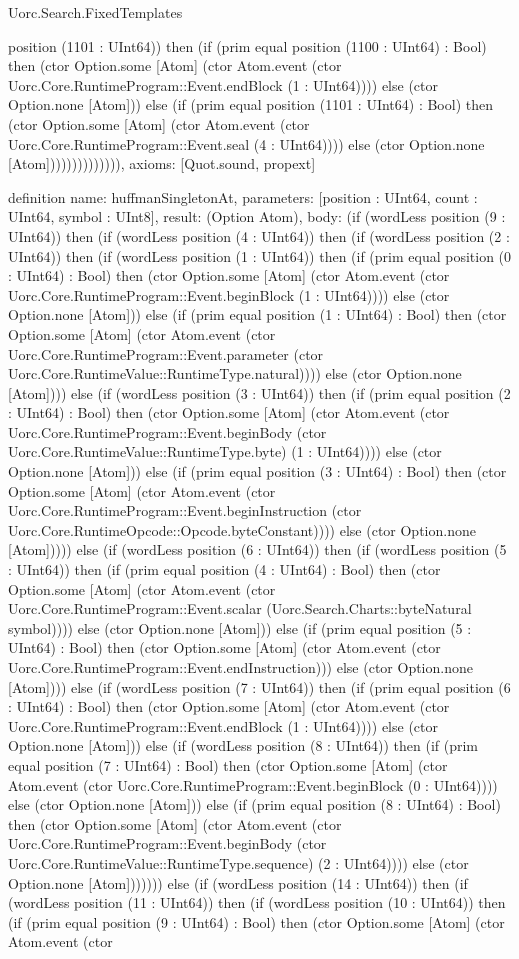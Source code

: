 \begin{lexlean}{Uorc.Search.FixedTemplates}
\begin{semanticmodule}
{position (1101 : UInt64)) then (if (prim equal position (1100 : UInt64) : Bool) then (ctor Option.some [Atom] (ctor Atom.event (ctor Uorc.Core.RuntimeProgram::Event.endBlock (1 : UInt64)))) else (ctor Option.none [Atom])) else (if (prim equal position (1101 : UInt64) : Bool) then (ctor Option.some [Atom] (ctor Atom.event (ctor Uorc.Core.RuntimeProgram::Event.seal (4 : UInt64)))) else (ctor Option.none [Atom]))))))))))))),
  axioms: [Quot.sound, propext]
}

definition{
  name: huffmanSingletonAt,
  parameters: [position : UInt64, count : UInt64, symbol : UInt8],
  result: (Option Atom),
  body: (if (wordLess position (9 : UInt64)) then (if (wordLess position (4 : UInt64)) then (if (wordLess position (2 : UInt64)) then (if (wordLess position (1 : UInt64)) then (if (prim equal position (0 : UInt64) : Bool) then (ctor Option.some [Atom] (ctor Atom.event (ctor Uorc.Core.RuntimeProgram::Event.beginBlock (1 : UInt64)))) else (ctor Option.none [Atom])) else (if (prim equal position (1 : UInt64) : Bool) then (ctor Option.some [Atom] (ctor Atom.event (ctor Uorc.Core.RuntimeProgram::Event.parameter (ctor Uorc.Core.RuntimeValue::RuntimeType.natural)))) else (ctor Option.none [Atom]))) else (if (wordLess position (3 : UInt64)) then (if (prim equal position (2 : UInt64) : Bool) then (ctor Option.some [Atom] (ctor Atom.event (ctor Uorc.Core.RuntimeProgram::Event.beginBody (ctor Uorc.Core.RuntimeValue::RuntimeType.byte) (1 : UInt64)))) else (ctor Option.none [Atom])) else (if (prim equal position (3 : UInt64) : Bool) then (ctor Option.some [Atom] (ctor Atom.event (ctor Uorc.Core.RuntimeProgram::Event.beginInstruction (ctor Uorc.Core.RuntimeOpcode::Opcode.byteConstant)))) else (ctor Option.none [Atom])))) else (if (wordLess position (6 : UInt64)) then (if (wordLess position (5 : UInt64)) then (if (prim equal position (4 : UInt64) : Bool) then (ctor Option.some [Atom] (ctor Atom.event (ctor Uorc.Core.RuntimeProgram::Event.scalar (Uorc.Search.Charts::byteNatural symbol)))) else (ctor Option.none [Atom])) else (if (prim equal position (5 : UInt64) : Bool) then (ctor Option.some [Atom] (ctor Atom.event (ctor Uorc.Core.RuntimeProgram::Event.endInstruction))) else (ctor Option.none [Atom]))) else (if (wordLess position (7 : UInt64)) then (if (prim equal position (6 : UInt64) : Bool) then (ctor Option.some [Atom] (ctor Atom.event (ctor Uorc.Core.RuntimeProgram::Event.endBlock (1 : UInt64)))) else (ctor Option.none [Atom])) else (if (wordLess position (8 : UInt64)) then (if (prim equal position (7 : UInt64) : Bool) then (ctor Option.some [Atom] (ctor Atom.event (ctor Uorc.Core.RuntimeProgram::Event.beginBlock (0 : UInt64)))) else (ctor Option.none [Atom])) else (if (prim equal position (8 : UInt64) : Bool) then (ctor Option.some [Atom] (ctor Atom.event (ctor Uorc.Core.RuntimeProgram::Event.beginBody (ctor Uorc.Core.RuntimeValue::RuntimeType.sequence) (2 : UInt64)))) else (ctor Option.none [Atom])))))) else (if (wordLess position (14 : UInt64)) then (if (wordLess position (11 : UInt64)) then (if (wordLess position (10 : UInt64)) then (if (prim equal position (9 : UInt64) : Bool) then (ctor Option.some [Atom] (ctor Atom.event (ctor }
\end{semanticmodule}
\end{lexlean}
